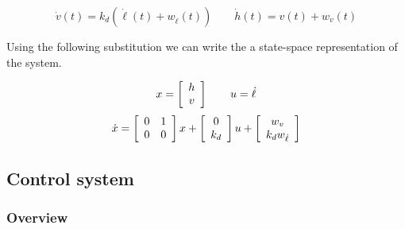 \documentclass[11pt]{scrartcl} %
\begin{document}
\[ \dot v(t) = k_d(\dot \ell(t) + w_{\dot \ell}(t)) \qquad \dot h(t) = v(t) + w_v(t) \]

Using the following substitution we can write the a state-space representation of the system. 

\[x = \mx{c}{h \\ v} \qquad u = \dot \ell\]
\[\dot x = \mx{cc}{0 & 1 \\ 0 & 0}x + \mx{cc}{0 \\ k_d} u + \mx{c}{w_v \\ k_d w_{\dot \ell}}\]

\subsection{Control system}
\subsubsection{Overview}
\end{document}
